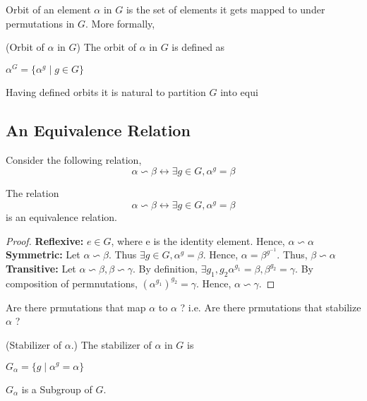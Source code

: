 Orbit of an element $\alpha$ in $G$ is the set of elements it gets mapped to under permutations in $G$. More formally,

\begin{definition}(Orbit of $\alpha$ in $G$)
The orbit of $\alpha$ in $G$ is defined as
\begin{center}
$\alpha^G = \{\alpha^g \mid g \in G\}$
\end{center}
\end{definition}

Having defined orbits it is natural to partition $G$ into equi



\subsection{An Equivalence Relation}
Consider the following relation,
\[\alpha \backsim \beta \leftrightarrow \exists g \in G, \alpha^g = \beta\]

\begin{claim}
The relation 
\[\alpha \backsim \beta \leftrightarrow \exists g \in G, \alpha^g = \beta\]
is an equivalence relation. 
\end{claim}
\begin{proof}
\textbf{Reflexive:} $e \in G$, where e is the identity element. Hence, $\alpha \backsim \alpha$ \\
\textbf{Symmetric:} Let $\alpha \backsim \beta$. Thus $\exists g \in G, \alpha^g = \beta$. Hence, $\alpha = \beta^{g^{-1}}$. Thus, $\beta \backsim \alpha$ \\
\textbf{Transitive:} Let $\alpha \backsim \beta, \beta \backsim \gamma$. By definition, $\exists g_1, g_2 \alpha^{g_1} = \beta, \beta^{g_2} = \gamma$. By composition of permnutations, $(\alpha^{g_1})^{g_2} = \gamma$. Hence, $\alpha \backsim \gamma$.
\end{proof}

Are there prmutations that map $\alpha$ to $\alpha$ ? i.e. Are there prmutations that stabilize $\alpha$ ?


\begin{definition}(Stabilizer of $\alpha$.)
The stabilizer of $\alpha$ in $G$ is 
\begin{center}
$G_{\alpha} = \{g \mid \alpha^g = \alpha\}$
\end{center}
\end{definition}

\begin{observation}
$G_{\alpha}$ is a Subgroup of $G$.
\end{observation}

